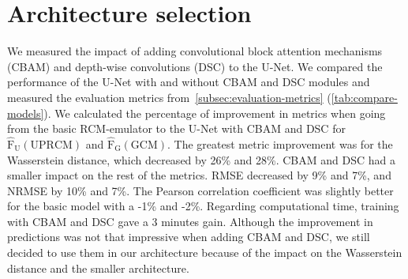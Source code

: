 \documentclass[a4paper,11pt,oneside]{report}
\begin{document}
\section{Architecture selection}
We measured the impact of adding convolutional block attention mechanisms (CBAM) and depth-wise convolutions (DSC) to the U-Net. We compared the performance of the U-Net with and without CBAM and DSC modules and measured the evaluation metrics from~\autoref{subsec:evaluation-metrics} (\autoref{tab:compare-models}). We calculated the percentage of improvement in metrics when going from the basic RCM-emulator to the U-Net with CBAM and DSC for $\mathrm{\hat{F}_{U}(UPRCM)}$ and $\mathrm{\hat{F}_{G}(GCM)}$. The greatest metric improvement was for the Wasserstein distance, which decreased by 26\% and 28\%. CBAM and DSC had a smaller impact on the rest of the metrics. RMSE decreased by 9\% and 7\%, and NRMSE by 10\% and 7\%. The Pearson correlation coefficient was slightly better for the basic model with a -1\% and -2\%. Regarding computational time, training with CBAM and DSC gave a 3 minutes gain. Although the improvement in predictions was not that impressive when adding CBAM and DSC, we still decided to use them in our architecture because of the impact on the Wasserstein distance and the smaller architecture. 

\newpage
\begin{landscape}

\end{landscape}
\end{document}
